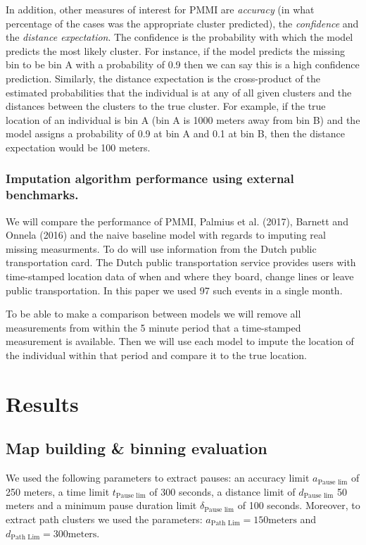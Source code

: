 \documentclass[man]{apa6}
\theoremstyle{definition}
\theoremstyle{definition}
\theoremstyle{definition}
\theoremstyle{remark}
\begin{document}
In addition, other measures of interest for PMMI are \emph{accuracy} (in
what percentage of the cases was the appropriate cluster predicted), the
\emph{confidence} and the \emph{distance expectation}. The confidence is
the probability with which the model predicts the most likely cluster.
For instance, if the model predicts the missing bin to be bin A with a
probability of 0.9 then we can say this is a high confidence prediction.
Similarly, the distance expectation is the cross-product of the
estimated probabilities that the individual is at any of all given
clusters and the distances between the clusters to the true cluster. For
example, if the true location of an individual is bin A (bin A is 1000
meters away from bin B) and the model assigns a probability of 0.9 at
bin A and 0.1 at bin B, then the distance expectation would be 100
meters.

\subsubsection{Imputation algorithm performance using external
benchmarks.}\label{imputation-algorithm-performance-using-external-benchmarks.}

We will compare the performance of PMMI, Palmius et al. (2017), Barnett
and Onnela (2016) and the naive baseline model with regards to imputing
real missing measurments. To do will use information from the Dutch
public transportation card. The Dutch public transportation service
provides users with time-stamped location data of when and where they
board, change lines or leave public transportation. In this paper we
used 97 such events in a single month.

To be able to make a comparison between models we will remove all
measurements from within the 5 minute period that a time-stamped
measurement is available. Then we will use each model to impute the
location of the individual within that period and compare it to the true
location.

\section{Results}\label{results}

\subsection{Map building \& binning
evaluation}\label{map-building-binning-evaluation-1}

We used the following parameters to extract pauses: an accuracy limit
\(a_{\text{Pause lim}}\) of 250 meters, a time limit
\(t_{\text{Pause lim}}\) of 300 seconds, a distance limit of
\(d_{\text{Pause lim}}\) 50 meters and a minimum pause duration limit
\(\delta_{\text{Pause lim}}\) of 100 seconds. Moreover, to extract path
clusters we used the parameters:
\(a_{\text{Path Lim}} = 150 \text{meters}\) and
\(d_{\text{Path Lim}} =300 \text{meters}\).
\end{document}
